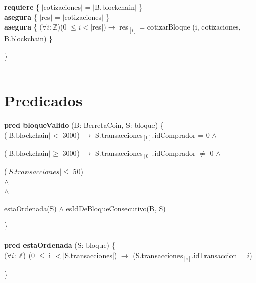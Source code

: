 \documentclass{article}
\newcommand{\Entero}{$\mathds{Z}$}
\begin{document}
        \indent\indent \textbf{requiere} \{ $|$cotizaciones$|$ = $|$B.blockchain$|$ \}\\

        \indent\indent \textbf{asegura} \{ $|$res$|$ = $|$cotizaciones$|$ \}\\

        \indent\indent \textbf{asegura} \{ $(\forall i: $\Entero)(0 $\le i < |$res$|)\rightarrow$ res$_{[i]}$ = cotizarBloque (i, cotizaciones, B.blockchain) \}

    \}\\\\

    







\newpage
\section*{Predicados}

    \textbf{pred bloqueValido} (B: BerretaCoin, S: bloque) \{\\
        \indent\indent ($|$B.blockchain$|<$ 3000) $\rightarrow$ S.transacciones$_{[0]}$.idComprador = 0 $\land$

        \indent\indent ($|$B.blockchain$|\ge$ 3000) $\rightarrow$ S.transacciones$_{[0]}$.idComprador $\ne$ 0 $\land$

        \indent\indent ($|S.transacciones| \le$ 50)\\
        \indent\indent$\land$\\
        \indent\indent[($\forall$ transaccion $\in$ S.transacciones) $\rightarrow$ [(transaccion.idComprador $\ne$ transaccion.idVendedor) $\land$

        \indent\indent(transaccion.id $>$ 0 $\land$ transaccion.idComprador $\ge$ 0 $\land$ transaccion.idVendedor $>$ 0 $\land$ transaccion.monto $>$ 0)] $\land$

        \indent\indent estaOrdenada(S) $\land$ esIdDeBloqueConsecutivo(B, S)

    \}\\\\

    \textbf{pred estaOrdenada} (S: bloque) \{\\
        \indent\indent $(\forall i$: \Entero) (0 $\le$ i $< |$S.transacciones$|$) $\rightarrow$ (S.transacciones$_{[i]}$.idTransaccion = $i$)

    \}\\\\
\end{document}
